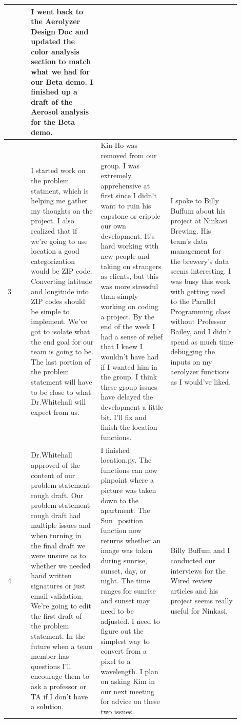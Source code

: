 \documentclass[onecolumn, draftclsnofoot,10pt, compsoc]{IEEEtran}
\begin{document}
\begin{singlespace}
\begin{longtable}{|l|p{0.3\linewidth}|p{0.3\linewidth}|p{0.3\linewidth}|}
			& I went back to the Aerolyzer Design Doc and updated the color analysis section to match what we had for our Beta demo.
			I finished up a draft of the Aerosol analysis for the Beta demo.
			\\\hline
			3 
			&I started work on the problem statment, which is helping me gather my thoughts on the project.
			I also realized that if we're going to use location a good categorization would be ZIP code. Converting latitude and longitude into ZIP codes should be simple to implement.
			We've got to isolate what the end goal for our team is going to be.
			The last portion of the problem statement will have to be close to what Dr.Whitehall will expect from us.
			&Kin-Ho was removed from our group.
			I was extremely apprehensive at first since I didn't want to ruin his capstone or cripple our own development.
			It's hard working with new people and taking on strangers as clients, but this was more stressful than simply working on coding a project.
			By the end of the week I had a sense of relief that I knew I wouldn't have had if I wanted him in the group.
			I think these group issues have delayed the development a little bit.
			I'll fix and finish the location functions.
			&I spoke to Billy Buffum about his project at Ninkasi Brewing.
			His team's data management for the brewery's data seems interesting.
			I was busy this week with getting used to the Parallel Programming class without Professor Bailey, and I didn't spend as much time debugging the inputs on my aerolyzer functions as I would've liked.
			\\\hline
			4 
			&Dr.Whitehall approved of the content of our problem statement rough draft.
			Our problem statement rough draft had multiple issues and when turning in the final draft we were unsure as to whether we needed hand written signatures or just email validation.
			We're going to edit the first draft of the problem statement. In the future when a team member has questions I'll encourage them to ask a professor or TA if I don't have a solution.
			&I finished location.py.
			The functions can now pinpoint where a picture was taken down to the apartment.
			The Sun\_position function now returns whether an image was taken during sunrise, sunset, day, or night.
			The time ranges for sunrise and sunset may need to be adjusted.
			I need to figure out the simplest way to convert from a pixel to a wavelength.
			I plan on asking Kim in our next meeting for advice on these two issues.
			& Billy Buffum and I conducted our interviews for the Wired review articles and his project seems really useful for Ninkasi.

\end{longtable}
\end{singlespace}
\end{document}
